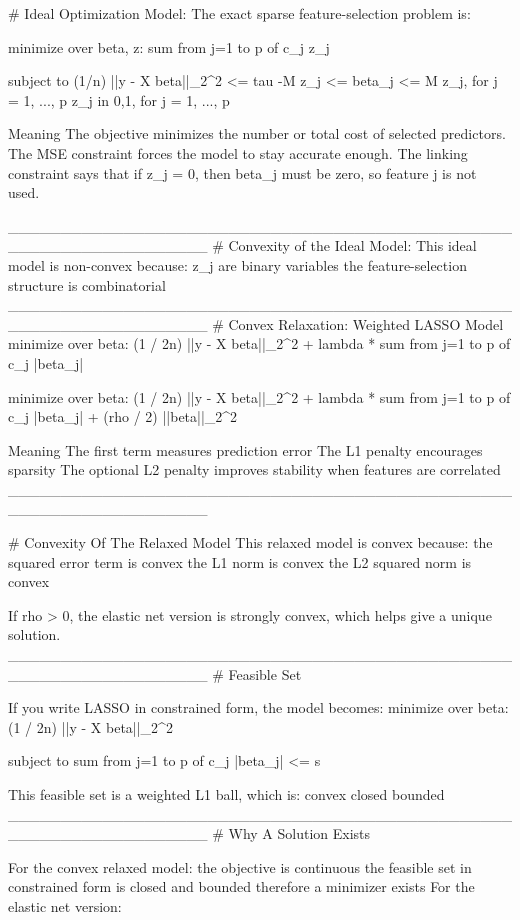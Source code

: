 # Ideal Optimization Model:
The exact sparse feature-selection problem is:

minimize over beta, z:
sum from j=1 to p of c_j z_j

subject to
(1/n) ||y - X beta||_2^2 <= tau
-M z_j <= beta_j <= M z_j,   for j = 1, ..., p
z_j in {0,1},   for j = 1, ..., p

Meaning
The objective minimizes the number or total cost of selected predictors.
The MSE constraint forces the model to stay accurate enough.
The linking constraint says that if z_j = 0, then beta_j must be zero, so feature j is not used.

___________________________________________________________________
# Convexity of the Ideal Model:
This ideal model is non-convex because:
z_j are binary variables
the feature-selection structure is combinatorial
___________________________________________________________________
# Convex Relaxation: Weighted LASSO Model
minimize over beta:
(1 / 2n) ||y - X beta||_2^2 + lambda * sum from j=1 to p of c_j |beta_j|

minimize over beta:
(1 / 2n) ||y - X beta||_2^2
+ lambda * sum from j=1 to p of c_j |beta_j|
+ (rho / 2) ||beta||_2^2

Meaning
The first term measures prediction error
The L1 penalty encourages sparsity
The optional L2 penalty improves stability when features are correlated
___________________________________________________________________

# Convexity Of The Relaxed Model
This relaxed model is convex because:
the squared error term is convex
the L1 norm is convex
the L2 squared norm is convex

If rho > 0, the elastic net version is strongly convex, which helps give a unique solution.
___________________________________________________________________
# Feasible Set

If you write LASSO in constrained form, the model becomes:
minimize over beta:
(1 / 2n) ||y - X beta||_2^2

subject to
sum from j=1 to p of c_j |beta_j| <= s

This feasible set is a weighted L1 ball, which is:
convex
closed
bounded
___________________________________________________________________
# Why A Solution Exists

For the convex relaxed model:
the objective is continuous
the feasible set in constrained form is closed and bounded
therefore a minimizer exists
For the elastic net version:

